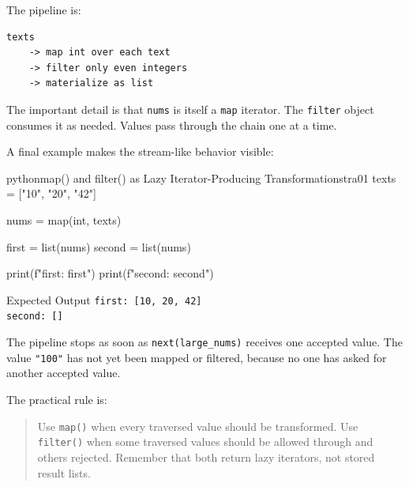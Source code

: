 The pipeline is:

\begin{verbatim}
texts
    -> map int over each text
    -> filter only even integers
    -> materialize as list
\end{verbatim}

The important detail is that \texttt{nums} is itself a \texttt{map} iterator. The \texttt{filter} object consumes it as needed. Values pass through the chain one at a time.

A final example makes the stream-like behavior visible:

\begin{codebox}[]{python}{map() and filter() as Lazy Iterator-Producing Transformations}{tra01}
texts = ["10", "20", "42"]

nums = map(int, texts)

first = list(nums)
second = list(nums)

print(f"first: {first}")
print(f"second: {second}")
\end{codebox}


\begin{iobox}{Expected Output}
\texttt{first: [10, 20, 42]} \\
\texttt{second: []} \\
\end{iobox}




The pipeline stops as soon as \texttt{next(large\_nums)} receives one accepted value. The value \texttt{"100"} has not yet been mapped or filtered, because no one has asked for another accepted value.

The practical rule is:

\begin{quote}
Use \texttt{map()} when every traversed value should be transformed. Use \texttt{filter()} when some traversed values should be allowed through and others rejected. Remember that both return lazy iterators, not stored result lists.
\end{quote}